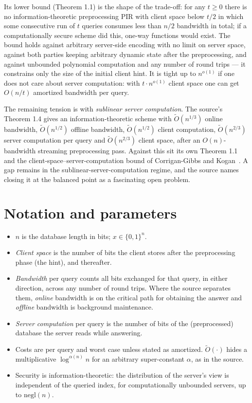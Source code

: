 \documentclass{conjura-conjecture}
\newcommand{\Ot}{\widetilde{O}}
\begin{document}
Its lower bound (Theorem 1.1) is the shape of the trade-off: for any $t
\ge 0$ there is no information-theoretic preprocessing PIR with client
space below $t/2$ in which some consecutive run of $t$ queries consumes
less than $n/2$ bandwidth in total; if a computationally secure scheme
did this, one-way functions would exist. The bound holds against
arbitrary server-side encoding with no limit on server space, against
both parties keeping arbitrary dynamic state after the preprocessing,
and against unbounded polynomial computation and any number of round
trips --- it constrains only the size of the initial client hint. It is
tight up to $n^{o(1)}$ if one does not care about server computation:
with $t \cdot n^{o(1)}$ client space one can get $O(n/t)$ amortized
bandwidth per query.

The remaining tension is with \emph{sublinear server computation}. The
source's Theorem 1.4 gives an information-theoretic scheme with
$\Ot(n^{1/3})$ online bandwidth, $\Ot(n^{1/2})$ offline bandwidth,
$\Ot(n^{1/2})$ client computation, $\Ot(n^{2/3})$ server computation per
query and $\Ot(n^{2/3})$ client space, after an $O(n)$-bandwidth
streaming preprocessing pass. Against this sit its own Theorem 1.1 and
the client-space--server-computation bound of Corrigan-Gibbs and
Kogan~\cite{CK20}. A gap remains in the sublinear-server-computation
regime, and the source names closing it at the balanced point as a
fascinating open problem.

\section{Notation and parameters}\label{sec:notation}

\begin{itemize}[nosep]
  \item $n$ is the database length in bits; $x \in \{0,1\}^{n}$.
  \item \emph{Client space} is the number of bits the client stores after
    the preprocessing phase (the hint), and thereafter.
  \item \emph{Bandwidth} per query counts all bits exchanged for that
    query, in either direction, across any number of round trips. Where
    the source separates them, \emph{online} bandwidth is on the
    critical path for obtaining the answer and \emph{offline} bandwidth
    is background maintenance.
  \item \emph{Server computation} per query is the number of bits of the
    (preprocessed) database the server reads while answering.
  \item Costs are per query and worst case unless stated as amortized.
    $\Ot(\cdot)$ hides a multiplicative $\log^{\alpha(n)} n$ for an
    arbitrary super-constant $\alpha$, as in the source.
  \item Security is information-theoretic: the distribution of the
    server's view is independent of the queried index, for
    computationally unbounded servers, up to $\mathrm{negl}(n)$.
\end{itemize}
\end{document}

